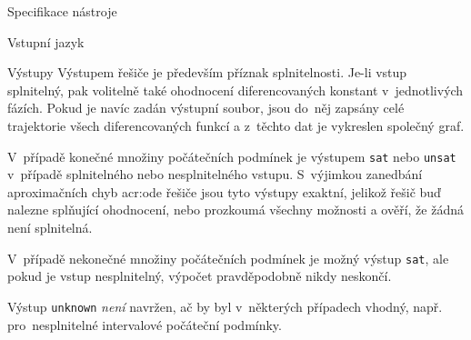 \documentclass[thesis=M,czech]{FITthesis}[2012/06/26]
\newcommand{\acrlabel}[1]{acr:#1}
\newcommand{\acr}[1]{\acrshort{\acrlabel{#1}}}
\newcommand{\id}[1]{\texttt{#1}}
\newcommand{\hl}[1]{\textit{#1}}
\begin{document}
\begin{section}{Specifikace nástroje}
\begin{subsection}{Vstupní jazyk}

\end{subsection} %


\begin{subsection}{Výstupy}\label{ss:design:spec:out}
Výstupem řešiče je především příznak splnitelnosti.
Je-li vstup splnitelný,
pak volitelně také ohodnocení diferencovaných konstant
v~jednotlivých fázích.
Pokud je navíc zadán výstupní soubor,
jsou do~něj zapsány celé trajektorie
všech diferencovaných funkcí
a z~těchto dat je vykreslen společný graf.

V~případě konečné množiny počátečních podmínek
je výstupem \id{sat} nebo \id{unsat}
v~případě splnitelného nebo nesplnitelného vstupu.
S~výjimkou zanedbání aproximačních chyb \acr{ode} řešiče
jsou tyto výstupy exaktní,
jelikož řešič buď nalezne splňující ohodnocení,
nebo prozkoumá všechny možnosti a ověří, že žádná není splnitelná.

V~případě nekonečné množiny počátečních podmínek
je možný výstup \id{sat},
ale pokud je vstup nesplnitelný,
výpočet pravděpodobně nikdy neskončí.

Výstup \id{unknown} \hl{není} navržen,
ač by byl v~některých případech vhodný,
např. pro~nesplnitelné intervalové počáteční podmínky.
\end{subsection} %


\end{section} %

\end{document}
